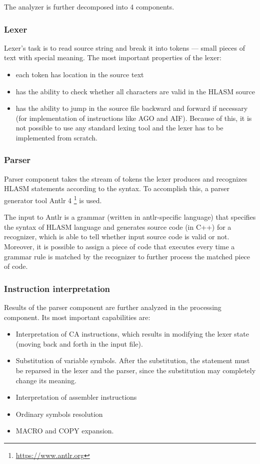 The analyzer is further decomposed into 4 components.

\subsubsection{Lexer}

Lexer's task is to read source string and break it into tokens --- small pieces of text with special meaning. The most important properties of the lexer:
\begin{itemize}
	\item each token has location in the source text
	\item has the ability to check whether all characters are valid in the HLASM source
	\item has the ability to jump in the source file backward and forward if necessary (for implementation of instructions like AGO and AIF). Because of this, it is not possible to use any standard lexing tool and the lexer has to be implemented from scratch.
\end{itemize}

\subsubsection{Parser}

Parser component takes the stream of tokens the lexer produces and recognizes HLASM statements according to the syntax. To accomplish this, a parser generator tool Antlr 4 \footnote{\url{https://www.antlr.org}} is used.

The input to Antlr is a grammar (written in antlr-specific language) that specifies the syntax of HLASM language and generates source code (in C++) for a recognizer, which is able to tell whether input source code is valid or not. Moreover, it is possible to assign a piece of code that executes every time a grammar rule is matched by the recognizer to further process the matched piece of code.

\subsubsection{Instruction interpretation}

Results of the parser component are further analyzed in the processing component. Its most important capabilities are:
\begin{itemize}
	\item Interpretation of CA instructions, which results in modifying the lexer state (moving back and forth in the input file).
	\item Substitution of variable symbols. After the substitution, the statement must be reparsed in the lexer and the parser, since the substitution may completely change its meaning.
	\item Interpretation of assembler instructions
	\item Ordinary symbols resolution
	\item MACRO and COPY expansion.
\end{itemize}

